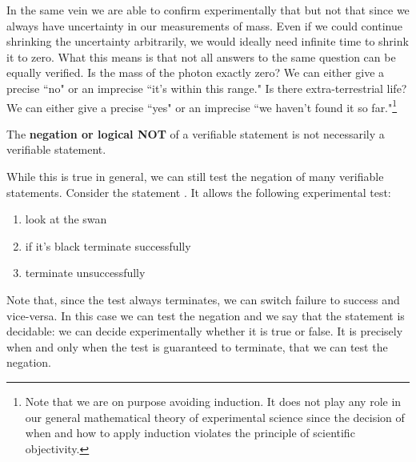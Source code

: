 \documentclass[11pt,letterpaper,fleqn]{memoir} %
\begin{document}
In the same vein we are able to confirm experimentally that  but not that  since we always have uncertainty in our measurements of mass. Even if we could continue shrinking the uncertainty arbitrarily, we would ideally need infinite time to shrink it to zero. What this means is that not all answers to the same question can be equally verified. Is the mass of the photon exactly zero? We can either give a precise ``no" or an imprecise ``it's within this range." Is there extra-terrestrial life? We can either give a precise ``yes" or an imprecise ``we haven't found it so far."\footnote{Note that we are on purpose avoiding induction. It does not play any role in our general mathematical theory of experimental science since the decision of when and how to apply induction violates the principle of scientific objectivity.}

\begin{mathSection}
	\begin{remark}
	The \textbf{negation or logical NOT} of a verifiable statement is not necessarily a verifiable statement.
	\end{remark}
\end{mathSection}

While this is true in general, we can still test the negation of many verifiable statements. Consider the statement . It allows the following experimental test:
\begin{enumerate}
	\item look at the swan
	\item if it's black terminate successfully
	\item terminate unsuccessfully
\end{enumerate}
Note that, since the test always terminates, we can switch failure to success and vice-versa. In this case we can test the negation and we say that the statement is decidable: we can decide experimentally whether it is true or false. It is precisely when and only when the test is guaranteed to terminate, that we can test the negation.
\end{document}
